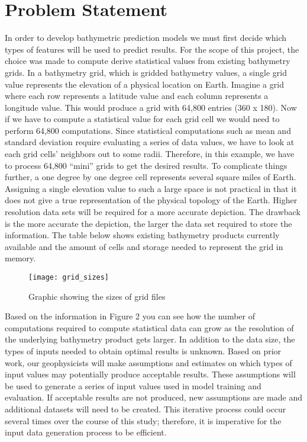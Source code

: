 \section{Problem Statement}
In order to develop bathymetric prediction models we must first decide which types of features will be used to predict results. 
For the scope of this project, the choice was made to compute derive statistical values from existing bathymetry grids. 
In a bathymetry grid, which is gridded bathymetry values, a single grid value represents the elevation of a physical location on Earth. 
Imagine a grid where each row represents a latitude value and each column represents a longitude value. 
This would produce a grid with 64,800 entries (360 x 180). 
Now if we have to compute a statistical value for each grid cell we would need to perform 64,800 computations. 
Since statistical computations such as mean and standard deviation require evaluating a series of data values, we have to look at each grid cells’ neighbors out to some radii. 
Therefore, in this example, we have to process 64,800 “mini” grids to get the desired results. 
To complicate things further, a one degree by one degree cell represents several square miles of Earth. 
Assigning a single elevation value to such a large space is not practical in that it does not give a true representation of the physical topology of the Earth. 
Higher resolution data sets will be required for a more accurate depiction.
The drawback is the more accurate the depiction, the larger the data set required to store the information. 
The table below shows existing bathymetry products currently available and the amount of cells and storage needed to represent the grid in memory.

\begin{figure}[h]
    \centering
    \texttt{[image: grid\_sizes]}
    \caption{Graphic showing the sizes of grid files}
    \label{fig2:Figure 2}
\end{figure}

\par
Based on the information in Figure 2 you can see how the number of computations required to compute statistical data can grow as the resolution of the underlying bathymetry product gets larger.
In addition to the data size, the types of inputs needed to obtain optimal results is unknown. 
Based on prior work, our geophysicists will make assumptions and estimates on which types of input values may potentially produce acceptable results. 
These assumptions will be used to generate a series of input values used in model training and evaluation. 
If acceptable results are not produced, new assumptions are made and additional datasets will need to be created. 
This iterative process could occur several times over the course of this study; therefore, it is imperative for the input data generation process to be efficient.

